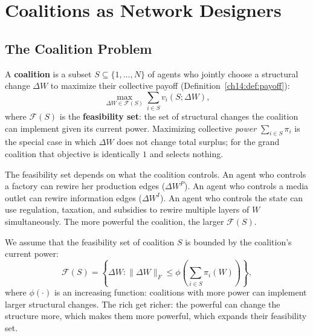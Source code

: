 \documentclass[../structural_economics_book.tex]{subfiles}
\begin{document}
\section{Coalitions as Network Designers}
\label{ch14:sec:coalitions}

\subsection{The Coalition Problem}

\begin{definition}[Coalition]\label{ch14:def:coalition}
A \textbf{coalition} is a subset $S \subseteq \{1, \ldots, N\}$ of agents who jointly choose a structural change $\Delta W$ to maximize their collective payoff (Definition~\ref{ch14:def:payoff}):
\begin{equation}\label{ch14:eq:coalition_objective}
\max_{\Delta W \in \mathcal{F}(S)} \sum_{i \in S} v_i(S; \Delta W),
\end{equation}
where $\mathcal{F}(S)$ is the \textbf{feasibility set}: the set of structural changes the coalition can implement given its current power. Maximizing collective \emph{power} $\sum_{i\in S}\pi_i$ is the special case in which $\Delta W$ does not change total surplus; for the grand coalition that objective is identically $1$ and selects nothing.
\end{definition}

The feasibility set depends on what the coalition controls. An agent who controls a factory can rewire her production edges ($\Delta W^P$). An agent who controls a media outlet can rewire information edges ($\Delta W^I$). An agent who controls the state can use regulation, taxation, and subsidies to rewire multiple layers of $W$ simultaneously. The more powerful the coalition, the larger $\mathcal{F}(S)$.

\begin{definition}\label{ch14:prop:feasibility}
We assume that the feasibility set of coalition $S$ is bounded by the coalition's current power:
\begin{equation}\label{ch14:eq:feasibility}
\mathcal{F}(S) = \left\{\Delta W : \|\Delta W\|_F \leq \phi\left(\sum_{i \in S} \pi_i(W)\right)\right\},
\end{equation}
where $\phi(\cdot)$ is an increasing function: coalitions with more power can implement larger structural changes. The rich get richer: the powerful can change the structure more, which makes them more powerful, which expands their feasibility set.
\end{definition}
\end{document}
